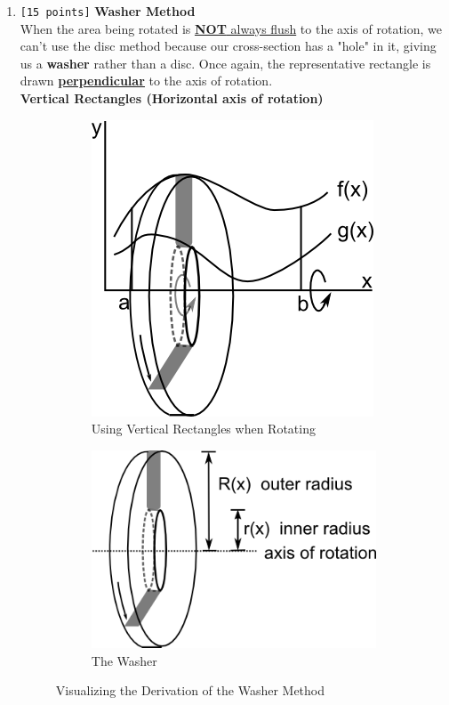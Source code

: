 \documentclass[10pt]{article}
\begin{document}
\begin{enumerate}
    \newpage

\item \verb![15 points]! \textbf{Washer Method} \\
    When the area being rotated is \underline{\textbf{NOT} always flush} to the axis of rotation, we can't use the disc method because our
    cross-section has a "hole" in it, giving us a \textbf{washer} rather than a disc. Once again, the representative rectangle is
    drawn \underline{\underline{\textbf{perpendicular}}} to the axis of rotation. \\
    \textbf{Vertical Rectangles (Horizontal axis of rotation)}

    \begin{figure}[h!]
        \centering
        \begin{subfigure}[b]{0.5\textwidth}
            \includegraphics[scale=.75]{wvr.png}
            \caption{Using Vertical Rectangles when Rotating}
            \label{fig:wvr}
        \end{subfigure}
        \begin{subfigure}[b]{0.3\textwidth}
            \includegraphics[scale=.60]{w.png}
            \caption{The Washer}
            \label{fig:w}
        \end{subfigure}
        \caption{Visualizing the Derivation of the Washer Method}\label{fig:washers}
    \end{figure}


\end{enumerate}
\end{document}
